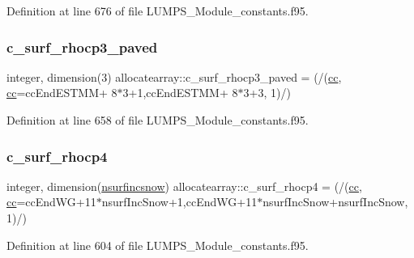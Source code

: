 Definition at line 676 of file L\+U\+M\+P\+S\+\_\+\+Module\+\_\+constants.\+f95.

\mbox{\label{namespaceallocatearray_ac9b0852b6692a5ef0caef755e260fa5a}} 
\subsubsection{\texorpdfstring{c\+\_\+surf\+\_\+rhocp3\+\_\+paved}{c\_surf\_rhocp3\_paved}}
{\footnotesize\ttfamily integer, dimension(3) allocatearray\+::c\+\_\+surf\+\_\+rhocp3\+\_\+paved = (/(\hyperlink{namespaceallocatearray_ac863c81704eb507dee10f5e10741e10c}{cc}, \hyperlink{namespaceallocatearray_ac863c81704eb507dee10f5e10741e10c}{cc}=cc\+End\+E\+S\+T\+MM+ 8$\ast$3+1,cc\+End\+E\+S\+T\+MM+ 8$\ast$3+3, 1)/)}



Definition at line 658 of file L\+U\+M\+P\+S\+\_\+\+Module\+\_\+constants.\+f95.

\mbox{\label{namespaceallocatearray_aeb83627142153ed809b4e704bd02f508}} 
\subsubsection{\texorpdfstring{c\+\_\+surf\+\_\+rhocp4}{c\_surf\_rhocp4}}
{\footnotesize\ttfamily integer, dimension(\hyperlink{namespaceallocatearray_af4d113f332b6759cfa22271140c9162d}{nsurfincsnow}) allocatearray\+::c\+\_\+surf\+\_\+rhocp4 = (/(\hyperlink{namespaceallocatearray_ac863c81704eb507dee10f5e10741e10c}{cc}, \hyperlink{namespaceallocatearray_ac863c81704eb507dee10f5e10741e10c}{cc}=cc\+End\+WG+11$\ast$nsurf\+Inc\+Snow+1,cc\+End\+WG+11$\ast$nsurf\+Inc\+Snow+nsurf\+Inc\+Snow, 1)/)}



Definition at line 604 of file L\+U\+M\+P\+S\+\_\+\+Module\+\_\+constants.\+f95.

\mbox{\label{namespaceallocatearray_a35c52b98a58d78f88b187f33aed86b06}} 
